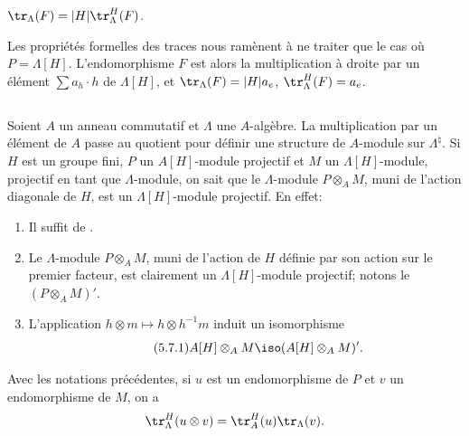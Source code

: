 \begin{proposition_}\label{II:5-6}
$\tr_\Lambda(F) = |H|\tr_\Lambda^H(F)$. 
\end{proposition_}

Les propriétés formelles des traces nous ramènent à ne traiter que le 
cas où $P=\Lambda[H]$. L'endomorphisme $F$ est alors la multiplication à 
droite par un élément $\sum a_h\cdot h$ de $\Lambda[H]$, et 
$\tr_\Lambda(F) = |H| a_e$, $\tr_\Lambda^H(F) = a_e$. 





\subsection{}\label{II:5-7}

Soient $A$ un anneau commutatif et $\Lambda$ une $A$-algèbre. La multiplication 
par un élément de $A$ passe au quotient pour définir une structure de 
$A$-module sur $\Lambda^\natural$. Si $H$ est un groupe fini, $P$ un $A[H]$-module 
projectif et $M$ un $\Lambda[H]$-module, projectif en tant que $\Lambda$-module, 
on sait que le $\Lambda$-module $P\otimes_A M$, muni de l'action diagonale de 
$H$, est un $\Lambda[H]$-module projectif. En effet: 
\begin{enumerate}[\indent a)]
  \item Il suffit de . 
  \item Le $\Lambda$-module $P\otimes_A M$, muni de l'action de $H$ définie 
    par son action sur le premier facteur, est clairement un 
    $\Lambda[H]$-module projectif; notons le $(P\otimes_A M)'$. 
  \item L'application $h\otimes m\mapsto h\otimes h^{-1} m$ induit un 
    isomorphisme 
    \begin{equation*}\tag{5.7.1}\label{II:eq:5-7-1}
      A[H]\otimes_A M \iso (A[H]\otimes_A M)' \text{.}
    \end{equation*}
\end{enumerate}





\begin{proposition_}\label{II:5-8}
Avec les notations précédentes, si $u$ est un endomorphisme de $P$ et 
$v$ un endomorphisme de $M$, on a 
\[
  \tr_\Lambda^H(u\otimes v) = \tr_A^H(u)\tr_\Lambda(v) \text{.}
\]
\end{proposition_}

